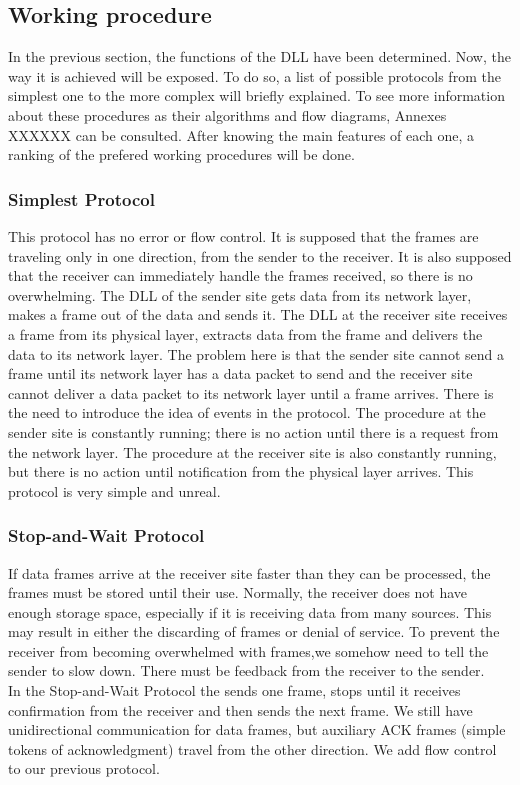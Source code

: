 \subsection{Working procedure}
In the previous section, the functions of the DLL have been determined. Now, the way it is achieved will be exposed. To do so, a list of possible protocols from the simplest one to the more complex will briefly explained. To see more information about these procedures as their algorithms and flow diagrams, Annexes XXXXXX can be consulted. After knowing the main features of each one, a ranking of the prefered working procedures will be done. 
\subsubsection{Simplest Protocol}
This protocol has no error or flow control. It is supposed that the frames are traveling only in one direction, from the sender to the receiver. It is also supposed that the receiver can immediately handle the frames received, so there is no overwhelming. The DLL of the sender site gets data from its network layer, makes a frame out of the data and sends it.
The DLL at the receiver site receives a frame from its physical layer, extracts data from the frame and delivers the data to its network layer. The problem here is that the sender site cannot send a frame until its network layer has a data packet to send and the receiver site cannot deliver a data packet to its network layer until a frame arrives. There is the need to introduce the idea of events in the protocol. The
procedure at the sender site is constantly running; there is no action until there is a request
from the network layer. The procedure at the receiver site is also constantly running, but
there is no action until notification from the physical layer arrives. This protocol is very simple and unreal.
\subsubsection{Stop-and-Wait Protocol}
If data frames arrive at the receiver site faster than they can be processed, the frames
must be stored until their use. Normally, the receiver does not have enough storage
space, especially if it is receiving data from many sources. This may result in either the
discarding of frames or denial of service. To prevent the receiver from becoming overwhelmed
with frames,we somehow need to tell the sender to slow down. There must be
feedback from the receiver to the sender.\\
In the Stop-and-Wait Protocol the sends one frame, stops until it receives confirmation from the receiver and then sends the next frame. We still have unidirectional communication
for data frames, but auxiliary ACK frames (simple tokens of acknowledgment) travel
from the other direction. We add flow control to our previous protocol. \\

